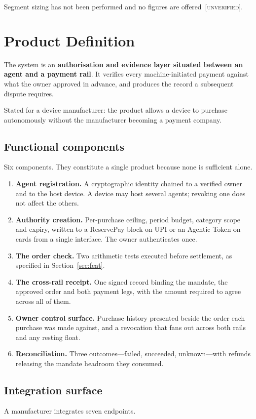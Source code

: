 \documentclass[journal,onecolumn,11pt]{IEEEtran}
\newcommand{\unver}{{\footnotesize\textsc{\textcolor{orange!80!black}{[unverified]}}}}
\begin{document}
Segment sizing has not been performed and no figures are offered~\unver.

\section{Product Definition}\label{sec:product}
The system is an \textbf{authorisation and evidence layer situated between an agent and
a payment rail}. It verifies every machine-initiated payment against what the owner
approved in advance, and produces the record a subsequent dispute requires.

Stated for a device manufacturer: the product allows a device to purchase autonomously
without the manufacturer becoming a payment company.

\subsection{Functional components}
Six components. They constitute a single product because none is sufficient alone.

\begin{enumerate}[leftmargin=*]
\item \textbf{Agent registration.} A cryptographic identity chained to a verified owner
and to the host device. A device may host several agents; revoking one does not affect
the others.
\item \textbf{Authority creation.} Per-purchase ceiling, period budget, category scope
and expiry, written to a ReservePay block on UPI or an Agentic Token on cards from a
single interface. The owner authenticates once.
\item \textbf{The order check.} Two arithmetic tests executed before settlement, as
specified in Section~\ref{sec:feat}.
\item \textbf{The cross-rail receipt.} One signed record binding the mandate, the
approved order and both payment legs, with the amount required to agree across all of
them.
\item \textbf{Owner control surface.} Purchase history presented beside the order each
purchase was made against, and a revocation that fans out across both rails and any
resting float.
\item \textbf{Reconciliation.} Three outcomes---failed, succeeded, unknown---with
refunds releasing the mandate headroom they consumed.
\end{enumerate}

\subsection{Integration surface}
A manufacturer integrates seven endpoints.
\end{document}
